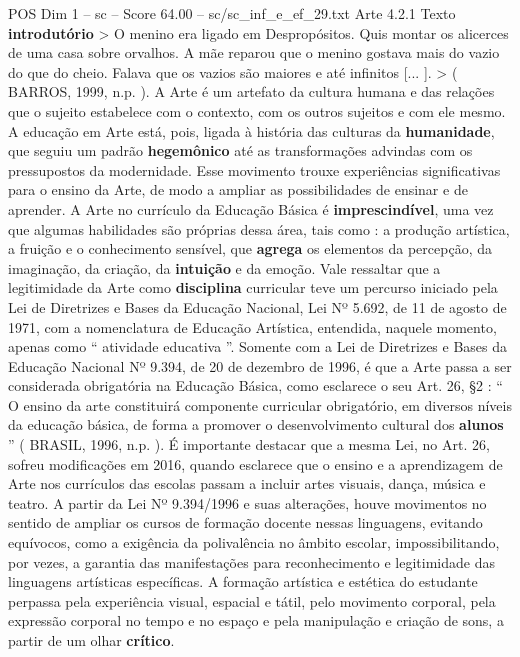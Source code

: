 \begin{textsample}{POS Dim 1 – sc – Score 64.00 – sc/sc\_inf\_e\_ef\_29.txt}  \label{ex:f1_pos_015}
Arte 4.2.1 Texto \textbf{introdutório} > O menino era ligado em Despropósitos.
Quis montar os alicerces de uma casa sobre orvalhos.
A mãe reparou que o menino gostava mais do vazio do que do cheio.
Falava que os vazios são maiores e até infinitos [... ]. > ( BARROS, 1999, n.p. ).
A Arte é um artefato da cultura humana e das relações que o sujeito estabelece com o contexto, com os outros sujeitos e com ele mesmo.
A educação em Arte está, pois, ligada à história das culturas da \textbf{humanidade}, que seguiu um padrão \textbf{hegemônico} até as transformações advindas com os pressupostos da modernidade.
Esse movimento trouxe experiências significativas para o ensino da Arte, de modo a ampliar as possibilidades de ensinar e de aprender.
A Arte no currículo da Educação Básica é \textbf{imprescindível}, uma vez que algumas habilidades são próprias dessa área, tais como : a produção artística, a fruição e o conhecimento sensível, que \textbf{agrega} os elementos da percepção, da imaginação, da criação, da \textbf{intuição} e da emoção.
Vale ressaltar que a legitimidade da Arte como \textbf{disciplina} curricular teve um percurso iniciado pela Lei de Diretrizes e Bases da Educação Nacional, Lei Nº 5.692, de 11 de agosto de 1971, com a nomenclatura de Educação Artística, entendida, naquele momento, apenas como “ atividade educativa ”.
Somente com a Lei de Diretrizes e Bases da Educação Nacional Nº 9.394, de 20 de dezembro de 1996, é que a Arte passa a ser considerada obrigatória na Educação Básica, como esclarece o seu Art. 26, §2 : “ O ensino da arte constituirá componente curricular obrigatório, em diversos níveis da educação básica, de forma a promover o desenvolvimento cultural dos \textbf{alunos} ” ( BRASIL, 1996, n.p. ).
É importante destacar que a mesma Lei, no Art. 26, sofreu modificações em 2016, quando esclarece que o ensino e a aprendizagem de Arte nos currículos das escolas passam a incluir artes visuais, dança, música e teatro.
A partir da Lei Nº 9.394/1996 e suas alterações, houve movimentos no sentido de ampliar os cursos de formação docente nessas linguagens, evitando equívocos, como a exigência da polivalência no âmbito escolar, impossibilitando, por vezes, a garantia das manifestações para reconhecimento e legitimidade das linguagens artísticas específicas.
A formação artística e estética do estudante perpassa pela experiência visual, espacial e tátil, pelo movimento corporal, pela expressão corporal no tempo e no espaço e pela manipulação e criação de sons, a partir de um olhar \textbf{crítico}.

\end{textsample}
